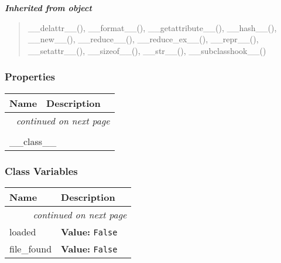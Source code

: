 \large{\textbf{\textit{Inherited from object}}}

\begin{quote}
\_\_delattr\_\_(), \_\_format\_\_(), \_\_getattribute\_\_(), \_\_hash\_\_(), \_\_new\_\_(), \_\_reduce\_\_(), \_\_reduce\_ex\_\_(), \_\_repr\_\_(), \_\_setattr\_\_(), \_\_sizeof\_\_(), \_\_str\_\_(), \_\_subclasshook\_\_()
\end{quote}


  \subsubsection{Properties}

    \vspace{-1cm}
\hspace{\varindent}\begin{longtable}{|p{\varnamewidth}|p{\vardescrwidth}|l}
\cline{1-2}
\cline{1-2} \centering \textbf{Name} & \centering \textbf{Description}& \\
\cline{1-2}
\endhead\cline{1-2}\multicolumn{3}{r}{\small\textit{continued on next page}}\\\endfoot\cline{1-2}
\endlastfoot\multicolumn{2}{|l|}{\textit{Inherited from object}}\\
\multicolumn{2}{|p{\varwidth}|}{\raggedright \_\_class\_\_}\\
\cline{1-2}
\end{longtable}



  \subsubsection{Class Variables}

    \vspace{-1cm}
\hspace{\varindent}\begin{longtable}{|p{\varnamewidth}|p{\vardescrwidth}|l}
\cline{1-2}
\cline{1-2} \centering \textbf{Name} & \centering \textbf{Description}& \\
\cline{1-2}
\endhead\cline{1-2}\multicolumn{3}{r}{\small\textit{continued on next page}}\\\endfoot\cline{1-2}
\endlastfoot\raggedright l\-o\-a\-d\-e\-d\- & \raggedright \textbf{Value:} 
{\tt False}&\\
\cline{1-2}
\raggedright f\-i\-l\-e\-\_\-f\-o\-u\-n\-d\- & \raggedright \textbf{Value:} 
{\tt False}&\\
\cline{1-2}
\end{longtable}

